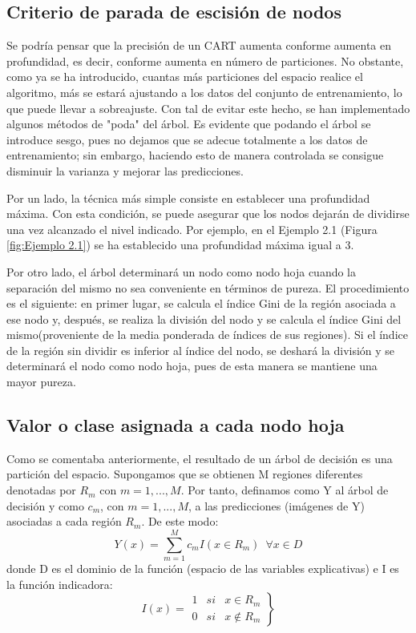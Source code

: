 \documentclass[12pt,twoside]{article}
\begin{document}
\subsection{Criterio de parada de escisión de nodos}
Se podría pensar que la precisión de un CART aumenta conforme aumenta en profundidad, es decir, conforme aumenta en número de particiones. No obstante, como ya se ha introducido, cuantas más particiones del espacio realice el algoritmo, más se estará ajustando a los datos del conjunto de entrenamiento, lo que puede llevar a sobreajuste. Con tal de evitar este hecho, se han implementado algunos métodos de "poda" del árbol. Es evidente que podando el árbol se introduce sesgo, pues no dejamos que se adecue totalmente a los datos de entrenamiento; sin embargo, haciendo esto de manera controlada se consigue disminuir la varianza y mejorar las predicciones.

Por un lado, la técnica más simple consiste en establecer una profundidad máxima. Con esta condición, se puede asegurar que los nodos dejarán de dividirse una vez alcanzado el nivel indicado. Por ejemplo, en el Ejemplo 2.1 (Figura \ref{fig:Ejemplo 2.1}) se ha establecido una profundidad máxima igual a 3.

Por otro lado, el árbol determinará un nodo como nodo hoja cuando la separación del mismo no sea conveniente en términos de pureza. El procedimiento es el siguiente: en primer lugar, se calcula el índice Gini de la región asociada a ese nodo y, después, se realiza la división del nodo y se calcula el índice Gini del mismo(proveniente de la media ponderada de índices de sus regiones). Si el índice de la región sin dividir es inferior al índice del nodo, se deshará la división y se determinará el nodo como nodo hoja, pues de esta manera se mantiene una mayor pureza.


\subsection{Valor o clase asignada a cada nodo hoja} \label{sec:2.4}
Como se comentaba anteriormente, el resultado de un árbol de decisión es una partición del espacio. Supongamos que se obtienen M regiones diferentes denotadas por $R_{m}$ con $m = 1, ..., M$. Por tanto, definamos como Y al árbol de decisión y como $c_m$, con $m = 1,...,M$, a las predicciones (imágenes de Y) asociadas a cada región $R_m$. De este modo:
\begin{equation*}
Y(x) = \sum^M_{m = 1} c_{m}I(x \in R_m) \, \, \, \forall x \in D
\end{equation*}
donde D es el dominio de la función (espacio de las variables explicativas) e I es la función indicadora:
\begin{equation*}
I(x) = 
\left.
\begin{array}{ccc}
1 & si & x \in R_m \\
0 & si & x \not\in R_m 
\end{array}
\right\}
\end{equation*}
\end{document}
